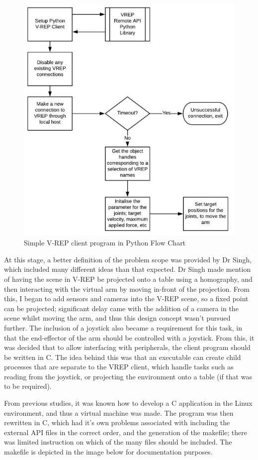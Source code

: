 \documentclass[12pt,openany,a4paper]{book}
\begin{document}
\begin{center}
\begin{figure}[htb]
  \includegraphics[width=0.8\linewidth]{python_flow_diagram.jpg}
\caption{Simple V-REP client program in Python Flow Chart}
\end{figure}
\end{center}


At this stage, a better definition of the problem scope was provided by Dr Singh, which included many different ideas than that expected. Dr Singh made mention of having the scene in V-REP be projected onto a table using a homography, and then interacting with the virtual arm by moving in-front of the projection. From this, I began to add sensors and cameras into the V-REP scene, so a fixed point can be projected; significant delay came with the addition of a camera in the scene whilst moving the arm, and thus this design concept wasn't pursued further. The inclusion of a joystick also became a requirement for this task, in that the end-effector of the arm should be controlled with a joystick. From this, it was decided that to allow interfacing with peripherals, the client program should be written in C. The idea behind this was that an executable can create child processes that are separate to the VREP client, which handle tasks such as reading from the joystick, or projecting the environment onto a table (if that was to be required).

From previous studies, it was known how to develop a C application in the Linux environment, and thus a virtual machine was made. The program was then rewritten in C, which had it's own problems associated with including the external API files in the correct order, and the generation of the makefile; there was limited instruction on which of the many files should be included. The makefile is depicted in the image below for documentation purposes.
\end{document}
